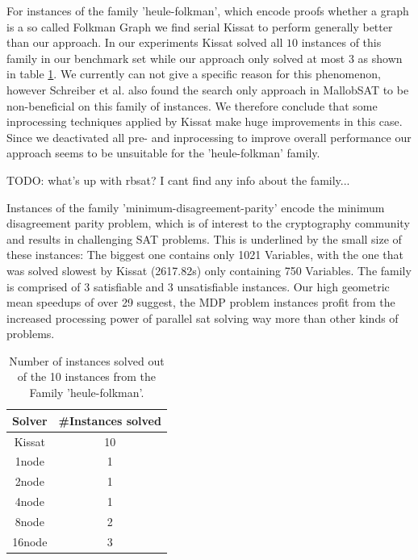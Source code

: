 \documentclass[12pt,a4paper,twoside]{scrartcl}
\numberwithin{equation}{section}
\begin{document}
For instances of the family 'heule-folkman', which encode proofs whether a graph is a so called Folkman Graph \cite{satComp2024} we find serial Kissat to perform generally better than our approach. In our experiments Kissat solved all $10$ instances of this family in our benchmark set while our approach only solved at most $3$ as shown in table \ref{tab:heuleFolkman}. We currently can not give a specific reason for this phenomenon, however Schreiber et al. \cite{searchOnlyPaper} also found the search only approach in MallobSAT to be non-beneficial on this family of instances. We therefore conclude that some inprocessing techniques applied by Kissat make huge improvements in this case. Since we deactivated all pre- and inprocessing to improve overall performance our approach seems to be unsuitable for the 'heule-folkman' family.

TODO: what's up with rbsat? I cant find any info about the family...

Instances of the family 'minimum-disagreement-parity' \cite{satComp2022} encode the minimum disagreement parity problem, which is of interest to the cryptography community and results in challenging SAT problems. This is underlined by the small size of these instances: The biggest one contains only 1021 Variables, with the one that was solved slowest by Kissat (2617.82s) only containing 750 Variables. The family is comprised of 3 satisfiable and 3 unsatisfiable instances. Our high geometric mean speedups of over 29 suggest, the MDP problem instances profit from the increased processing power of parallel sat solving way more than other kinds of problems.

\begin{table}
  \center
  \begin{tabular}{ c|c }
    Solver  & \#Instances solved\\
    \hline
    Kissat  & 10\\
    \hline
    1node   & 1\\
    \hline
    2node   & 1\\
    \hline
    4node   & 1\\
    \hline
    8node   & 2\\
    \hline
    16node  & 3
  \end{tabular}
  \caption{Number of instances solved out of the 10 instances from the Family 'heule-folkman'.}
  \label{tab:heuleFolkman}
\end{table}
\end{document}
